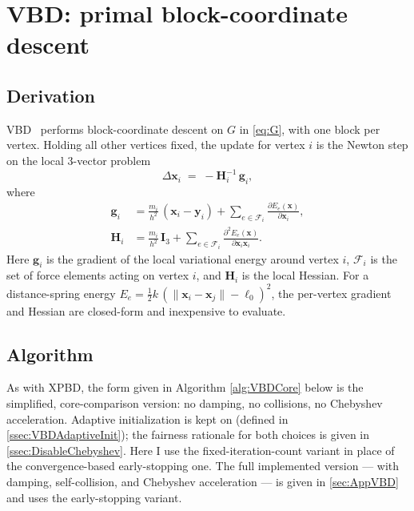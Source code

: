 \section{VBD: primal block-coordinate descent}
\label{sec:VBDAlgo}

\subsection{Derivation}
\label{ssec:VBDDeriv}
VBD~\cite{Chen2024} performs block-coordinate descent on $G$ in \eqref{eq:G}, with one block per
vertex. Holding all other vertices fixed, the update for vertex $i$ is the Newton
step on the local 3-vector problem
\begin{equation}
    \Delta\mathbf{x}_{i} \;=\; - \mathbf{H}_{i}^{-1}\,\mathbf{g}_{i},
\end{equation}
where
\begin{align}
    \mathbf{g}_{i} &= \frac{m_{i}}{h^{2}}\,(\mathbf{x}_{i} - \mathbf{y}_{i})
                      + \sum_{e \in \mathcal{F}_i} \frac{\partial E_{e}(\mathbf{x})}{\partial \mathbf{x}_i}, \\
    \mathbf{H}_{i} &= \frac{m_{i}}{h^{2}}\,\mathbf{I}_{3}
                      + \sum_{e \in \mathcal{F}_i} \frac{\partial^{2} E_{e}(\mathbf{x})}{\partial \mathbf{x}_i \mathbf{x}_i}.
\end{align}
Here $\mathbf{g}_{i}$ is the gradient of the local variational energy around
vertex $i$, $\mathcal{F}_i$ is the set of force elements acting on vertex $i$, and
$\mathbf{H}_{i}$ is the local Hessian. For a distance-spring energy
$E_{e} = \tfrac{1}{2} k\,(\|\mathbf{x}_{i} - \mathbf{x}_{j}\| - \ell_{0})^{2}$, the
per-vertex gradient and Hessian are closed-form and inexpensive to evaluate.

\subsection{Algorithm}
\label{ssec:VBDPseudo}
As with XPBD, the form given in Algorithm \autoref{alg:VBDCore} below is the simplified, core-comparison version: no
damping, no collisions, no Chebyshev acceleration. Adaptive initialization is kept on (defined in
\autoref{ssec:VBDAdaptiveInit}); the fairness rationale for both choices is given in
\autoref{ssec:DisableChebyshev}. Here I use the fixed-iteration-count variant in place of the
convergence-based early-stopping one. The full implemented version --- with damping, self-collision,
and Chebyshev acceleration --- is given in \autoref{sec:AppVBD} and uses the early-stopping variant.

